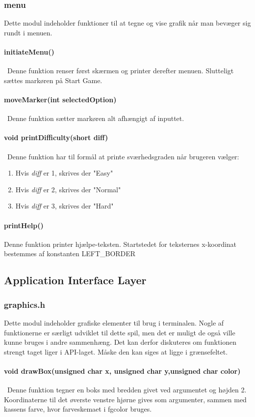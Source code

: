 \subsubsection{menu}
Dette modul indeholder funktioner til at tegne og vise grafik når man bevæger sig rundt i menuen.
\paragraph{initiateMenu()}\
Denne funktion renser først skærmen og printer derefter menuen. Slutteligt sættes markøren på Start Game.
\paragraph{moveMarker(int selectedOption)}\
Denne funktion sætter markøren alt afhængigt af inputtet.
\paragraph{void printDifficulty(short diff)}\
Denne funktion har til formål at printe sværhedsgraden når brugeren vælger:
\begin{enumerate}
\item Hvis \textit{diff} er 1, skrives der "Easy"
\item Hvis \textit{diff} er 2, skrives der "Normal"
\item Hvis \textit{diff} er 3, skrives der "Hard"
\end{enumerate}
\paragraph{printHelp()}
Denne funktion printer hjælpe-teksten. Startstedet for teksternes x-koordinat bestemmes af konstanten LEFT\_BORDER

\subsection{Application Interface Layer}
\subsubsection{graphics.h}
Dette modul indeholder grafiske elementer til brug i terminalen. Nogle af funktionerne er særligt udviklet til dette spil, men det er muligt de også ville kunne bruges i andre sammenhæng.  Det kan derfor diskuteres om funktionen strengt taget liger i API-laget. Måske den kan siges at ligge i grænsefeltet.
\paragraph{
void drawBox(unsigned char x, unsigned char y,unsigned char color)}\
Denne funktion tegner en boks med bredden givet ved argumentet og højden 2. Koordinaterne til det øverste venstre hjørne gives som argumenter, sammen med kassens farve, hvor farveskemaet i fgcolor bruges.

